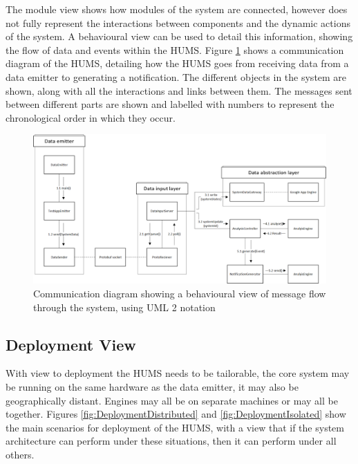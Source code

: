 \documentclass[10pt,a4paper]{article}
\begin{document}
The module view shows how modules of the system are connected, however does not
fully represent the interactions between components and the dynamic actions of
the system. A behavioural view can be used to detail this information, showing
the flow of data and events within the HUMS. Figure
\ref{fig:CommunicationDiagram} shows a communication diagram of the HUMS,
detailing how the HUMS goes from receiving data from a data emitter to
generating a notification. The different objects in the system are shown, along
with all the interactions and links between them. The messages sent between
different parts are shown and labelled with numbers to represent the
chronological order in which they occur.

\begin{figure}[!ht]
  \centering
  \includegraphics[width=14cm]{images/CommunicationDiagram.png}
  \caption{Communication diagram showing a behavioural view of message flow
through the system, using UML 2 notation}
  \label{fig:CommunicationDiagram}
\end{figure}


\subsection{Deployment View}

With view to deployment the HUMS needs to be tailorable, the core
system may be running on the same hardware as the data emitter, it may
also be geographically distant. Engines may all be on separate
machines or may all be together. Figures \ref{fig:DeploymentDistributed}
and \ref{fig:DeploymentIsolated} show the main scenarios for deployment
of the HUMS, with a view that if the system architecture can perform under
these situations, then it can perform under all others.
\end{document}
